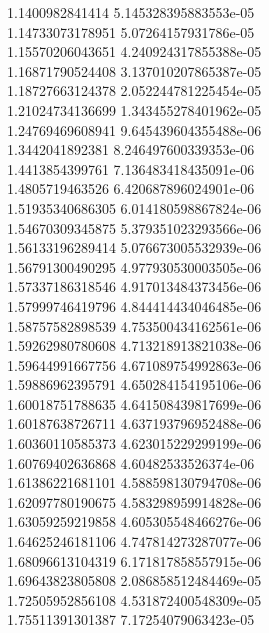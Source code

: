 {1.1400982841414 5.145328395883553e-05
 \\
1.14733073178951 5.07264157931786e-05
 \\
1.15570206043651 4.240924317855388e-05
 \\
1.16871790524408 3.137010207865387e-05
 \\
1.18727663124378 2.052244781225454e-05
 \\
1.21024734136699 1.343455278401962e-05
 \\
1.24769469608941 9.645439604355488e-06
 \\
1.3442041892381 8.246497600339353e-06
 \\
1.4413854399761 7.136483418435091e-06
 \\
1.4805719463526 6.420687896024901e-06
 \\
1.51935340686305 6.014180598867824e-06
 \\
1.54670309345875 5.379351023293566e-06
 \\
1.56133196289414 5.076673005532939e-06
 \\
1.56791300490295 4.977930530003505e-06
 \\
1.57337186318546 4.917013484373456e-06
 \\
1.57999746419796 4.844414434046485e-06
 \\
1.58757582898539 4.753500434162561e-06
 \\
1.59262980780608 4.713218913821038e-06
 \\
1.59644991667756 4.671089754992863e-06
 \\
1.59886962395791 4.650284154195106e-06
 \\
1.60018751788635 4.641508439817699e-06
 \\
1.60187638726711 4.637193796952488e-06
 \\
1.60360110585373 4.623015229299199e-06
 \\
1.60769402636868 4.60482533526374e-06
 \\
1.61386221681101 4.588598130794708e-06
 \\
1.62097780190675 4.583298959914828e-06
 \\
1.63059259219858 4.605305548466276e-06
 \\
1.64625246181106 4.747814273287077e-06
 \\
1.68096613104319 6.171817858557915e-06
 \\
1.69643823805808 2.086858512484469e-05
 \\
1.72505952856108 4.531872400548309e-05
 \\
1.75511391301387 7.17254079063423e-05
}
